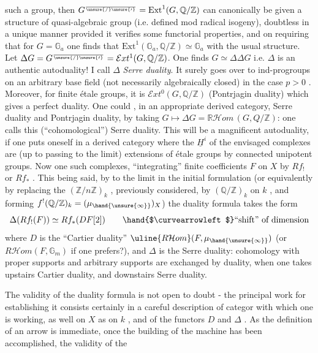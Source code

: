 
 such a group, then $G^{\over{\unsure{/}}{\unsure{\prime}}} = \mathrm{Ext}^1(G, \mathbb{Q}/\mathbb{Z})$ can canonically be given a structure
of quasi-algebraic group (i.e. defined mod radical isogeny), doubtless in
a unique manner provided it verifies some functorial properties, and on
requiring that for $G = \mathbb{G}_a$ one finds that $\mathrm{Ext}^1(\mathbb{G}_a, \mathbb{Q}/\mathbb{Z}) \simeq \mathbb{G}_a$ with the
 usual structure. Let $\Delta G = G^{\over{\unsure{/}}{\unsure{\prime}}} = \mathcal{E}xt^1(G, \mathbb{Q}/\mathbb{Z})$. One finds $G \simeq \Delta\Delta G$ i.e. $\Delta$
is an authentic autoduality! I call $\Delta$ \textit{Serre duality}. It surely goes over
to ind-progroups on an arbitrary base field (not necessarily algebraically closed)
in the case $p > 0$ . Moreover, for finite étale groups, it is $\mathcal{E}xt^0(G, \mathbb{Q}/\mathbb{Z})$
(Pontrjagin duality) which gives a perfect duality. One could , in
an appropriate derived category, Serre duality and Pontrjagin duality, by
taking $G \longmapsto \Delta G = \mathbb{R}\mathcal{H}om\,(G, Q/\mathbb{Z})$: one calls this (``cohomological'') Serre
duality. This will be a magnificent autoduality, if one puts oneself in a
derived category where the $\underline{H}^i$ of the envisaged complexes are (up to
passing to the limit) extensions of étale groups by connected unipotent
groups. Now one   such complexes,  ``integrating'' finite coefficients
$F$ on $X$ by $Rf_!$ or $Rf_*$ . This being said, by   to the limit in
the initial formulation (or equivalently by replacing the $(\mathbb{Z}/n\mathbb{Z})_k$ ,
previously considered, by $(\mathbb{Q}/\mathbb{Z})_k$ on $k$ , and forming $f^!(\mathbb{Q}/\mathbb{Z})_k = (\mu_{\hand{\unsure{\infty}}})_X$)
the duality formula takes the form
\[ \Delta(Rf_!(F)) \simeq Rf_*(DF[2]) \qquad \hand{$\curvearrowleft$}\text{``shift'' of dimension} \]
where $D$ is the ``Cartier duality'' $\uline{R\mathcal{H}om}(F, \mu_{\hand{\unsure{\infty}}})$ (or $R\mathcal{H}om(F, \mathbb{G}_m)$ if one
prefers?), and $\Delta$ is the Serre duality: cohomology with proper supports and 
arbitrary supports are exchanged by duality, when one takes upstairs Cartier
duality, and downstairs Serre duality.

The validity of the duality formula is not open to doubt - the principal
work for establishing it consists certainly in a careful description of 
 categor  with which one is working, as well on $X$ as on $k$ ,
and of the functors $D$ and $\Delta$ . As the definition of an arrow is immediate,
once the building of the machine has been accomplished, the validity of the

